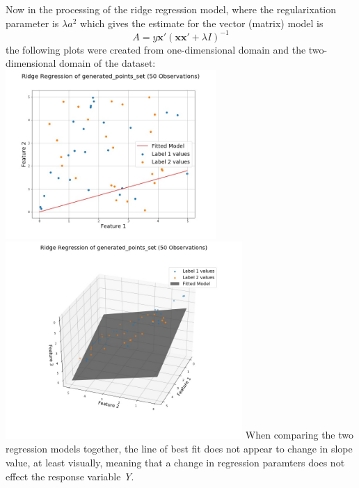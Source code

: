 \documentclass[a4paper,12pt]{IEEEtran}
\begin{document}
Now in the processing of the ridge regression model, where the regularixation parameter is $\lambda \textit{a}^{2}$ which gives the estimate for the vector (matrix) model is
$$\textit{A} = \textit{y}\textbf{x}'(\textbf{x}\textbf{x}' + \lambda \textit{I})^{-1}$$the following plots were created from one-dimensional domain and the two-dimensional domain of the dataset: \includegraphics[width=8cm]{ridge_reg_1d_generated_points_set} \includegraphics[width=9cm]{ridge_reg_2d_generated_points_set} When comparing the two regression models together, the line of best fit does not appear to change in slope value, at least visually, meaning that a change in regression paramters does not effect the response variable \textit{Y}.
\end{document}
